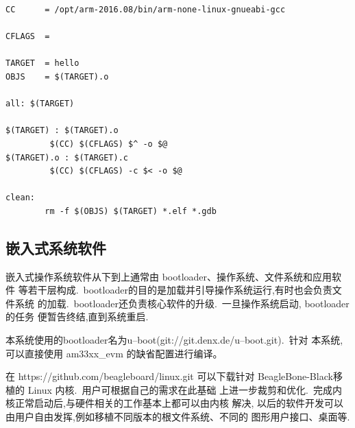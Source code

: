 \begin{boxedminipage}{.9\textwidth}
\lstset{language=make}
\begin{lstlisting}
CC      = /opt/arm-2016.08/bin/arm-none-linux-gnueabi-gcc

CFLAGS  =

TARGET  = hello
OBJS    = $(TARGET).o

all: $(TARGET)

$(TARGET) : $(TARGET).o
         $(CC) $(CFLAGS) $^ -o $@
$(TARGET).o : $(TARGET).c
         $(CC) $(CFLAGS) -c $< -o $@

clean:
        rm -f $(OBJS) $(TARGET) *.elf *.gdb
\end{lstlisting}
\end{boxedminipage}


\subsection{嵌入式系统软件}
	嵌入式操作系统软件从下到上通常由 bootloader、操作系统、文件系统和应用软件
等若干层构成.~bootloader的目的是加载并引导操作系统运行,有时也会负责文件系统
的加载.~bootloader还负责核心软件的升级.~一旦操作系统启动, bootloader的任务
便暂告终结,直到系统重启.

	本系统使用的bootloader名为u--boot(git://git.denx.de/u--boot.git).~针对
本系统, 可以直接使用 am33xx\_evm 的缺省配置进行编译。

	在 https://github.com/beagleboard/linux.git 可以下载针对
	BeagleBone-Black移植的 Linux 内核.~用户可根据自己的需求在此基础
上进一步裁剪和优化.~完成内核正常启动后,与硬件相关的工作基本上都可以由内核
解决, 以后的软件开发可以由用户自由发挥,例如移植不同版本的根文件系统、不同的
图形用户接口、桌面等.
